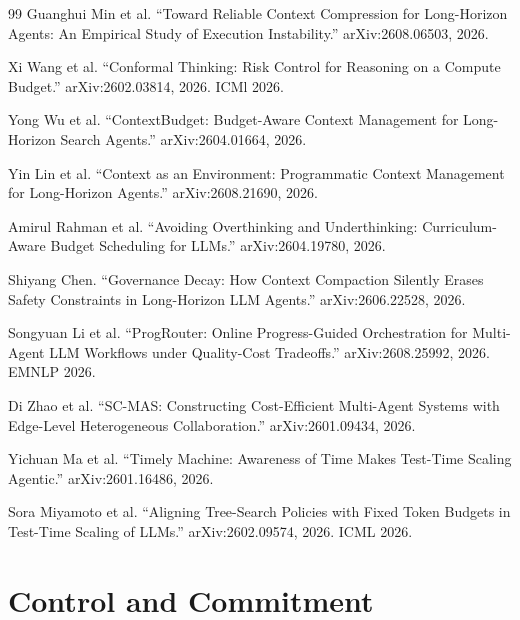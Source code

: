 \documentclass[11pt]{book}
\begin{document}
\begin{thebibliography}{99}
Guanghui Min et al.
``Toward Reliable Context Compression for Long-Horizon Agents: An Empirical Study of Execution Instability.''
arXiv:2608.06503, 2026.

Xi Wang et al.
``Conformal Thinking: Risk Control for Reasoning on a Compute Budget.''
arXiv:2602.03814, 2026. ICMl 2026.

Yong Wu et al.
``ContextBudget: Budget-Aware Context Management for Long-Horizon Search Agents.''
arXiv:2604.01664, 2026.

Yin Lin et al.
``Context as an Environment: Programmatic Context Management for Long-Horizon Agents.''
arXiv:2608.21690, 2026.

Amirul Rahman et al.
``Avoiding Overthinking and Underthinking: Curriculum-Aware Budget Scheduling for LLMs.''
arXiv:2604.19780, 2026.

Shiyang Chen.
``Governance Decay: How Context Compaction Silently Erases Safety Constraints in Long-Horizon LLM Agents.''
arXiv:2606.22528, 2026.

Songyuan Li et al.
``ProgRouter: Online Progress-Guided Orchestration for Multi-Agent LLM Workflows under Quality-Cost Tradeoffs.''
arXiv:2608.25992, 2026. EMNLP 2026.

Di Zhao et al.
``SC-MAS: Constructing Cost-Efficient Multi-Agent Systems with Edge-Level Heterogeneous Collaboration.''
arXiv:2601.09434, 2026.

Yichuan Ma et al.
``Timely Machine: Awareness of Time Makes Test-Time Scaling Agentic.''
arXiv:2601.16486, 2026.

Sora Miyamoto et al.
``Aligning Tree-Search Policies with Fixed Token Budgets in Test-Time Scaling of LLMs.''
arXiv:2602.09574, 2026. ICML 2026.
\end{thebibliography}
\part{Control and Commitment}

\end{document}
